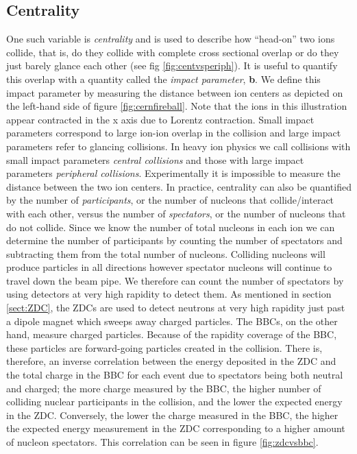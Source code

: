 \subsection{Centrality} \label{sect:centrality}
One such variable is \textit{centrality} and is used to describe how ``head-on'' two ions collide, that is, do they collide with complete cross sectional overlap or do they just barely glance each other (see fig \ref{fig:centvsperiph}). It is useful to quantify this overlap with a quantity called the \textit{impact parameter}, \textbf{b}. We define this impact parameter by measuring the distance between ion centers as depicted on the left-hand side of figure \ref{fig:cernfireball}. Note that the ions in this illustration appear contracted in the x axis due to Lorentz contraction. Small impact parameters correspond to large ion-ion overlap in the collision and large impact parameters refer to glancing collisions. In heavy ion physics we call collisions with small impact parameters \textit{central collisions} and those with large impact parameters \textit{peripheral collisions}. Experimentally it is impossible to measure the distance between the two ion centers. In practice, centrality can also be quantified by the number of \textit{participants}, or the number of nucleons that collide/interact with each other, versus the number of \textit{spectators}, or the number of nucleons that do not collide. Since we know the number of total nucleons in each ion we can determine the number of participants by counting the number of spectators and subtracting them from the total number of nucleons. Colliding nucleons will produce particles in all directions however spectator nucleons will continue to travel down the beam pipe. We therefore can count the number of spectators by using detectors at very high rapidity to detect them. As mentioned in section \ref{sect:ZDC}, the ZDCs are used to detect neutrons at very high rapidity just past a dipole magnet which sweeps away charged particles. The BBCs, on the other hand, measure charged particles. Because of the rapidity coverage of the BBC, these particles are forward-going particles created in the collision. There is, therefore, an inverse correlation between the energy deposited in the ZDC and the total charge in the BBC for each event due to spectators being both neutral and charged; the more charge measured by the BBC, the higher number of colliding nuclear participants in the collision, and the lower the expected energy in the ZDC. Conversely, the lower the charge measured in the BBC, the higher the expected energy measurement in the ZDC corresponding to a higher amount of nucleon spectators. This correlation can be seen in figure \ref{fig:zdcvsbbc}.
